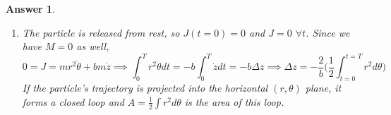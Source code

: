 \documentclass[a4paper]{article}
\newtheorem{ans}{Answer}[section]
\theoremstyle{new}
\begin{document}
\begin{ans}
\begin{enumerate}[label=(\alph*)]
Denote this as $J$, and check that it is indeed conserved (follows from the equations of motion):
$$J=\frac{\partial\mathcal{L}}{\partial\dot{\theta}_B}+\frac{\partial\mathcal{L}}{\partial\dot{\theta}}+b\frac{\partial\mathcal{L}}{\partial\dot{z}}=M(a^2+b^2)\dot{\theta}_B+mr^2\dot{\theta}+bm\dot{z},\quad\dot{J}=0$$
\item The particle is released from rest, so $J(t=0)=0$ and $J=0$ $\forall t$. Since we have $M=0$ as well,
$$0=J=mr^2\dot{\theta}+bm\dot{z}\implies\int_0^Tr^2\dot{\theta}dt=-b\int_0^T\dot{z}dt=-b\Delta z\implies\Delta z=-\frac{2}{b}\bigg(\frac{1}{2}\int_{t=0}^{t=T}r^2d\theta\bigg)$$
If the particle's trajectory is projected into the horizontal $(r,\theta)$ plane, it forms a closed loop and $A=\frac{1}{2}\int r^2d\theta$ is the area of this loop.
\end{enumerate}
\end{ans}
\newpage
\end{document}
